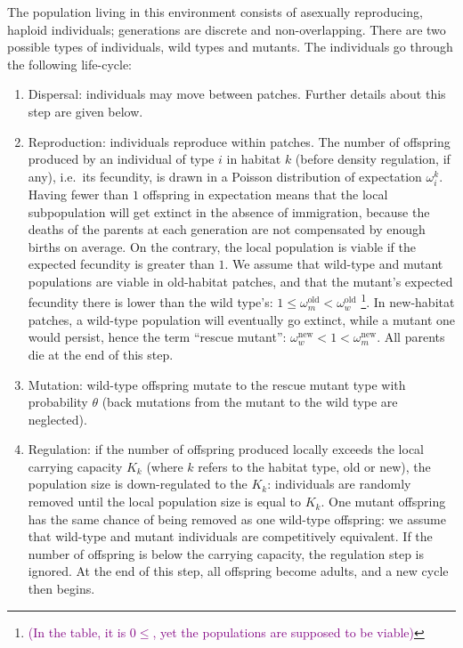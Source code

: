 \documentclass[a4paper,11pt]{article}
\newcommand{\florence}[1]{\textcolor{purple}{(#1)}} %
\begin{document}
The population living in this environment consists of asexually reproducing, haploid individuals; generations are discrete and non-overlapping. There are two possible types of individuals, wild types and mutants. The individuals go through the following life-cycle: \begin{enumerate}[label = (\roman*)]
	\item Dispersal: individuals may move between patches. Further details about this step are given below.
	\item Reproduction: individuals reproduce within patches. The number of offspring produced by an individual of type $i$ in habitat $k$ (before density regulation, if any), i.e.\ its fecundity, is drawn in a Poisson distribution of expectation $\omega_i^k$. Having fewer than $1$ offspring in expectation means that the local subpopulation will get extinct in the absence of immigration, because the deaths of the parents at each generation are not compensated by enough births on average. On the contrary, the local population is viable if the expected fecundity is greater than $1$. We assume that wild-type and mutant populations are viable in old-habitat patches, and that the mutant's expected fecundity there is lower than the wild type's: $1 \leq \omega^{\text{old}}_m < \omega^{\text{old}}_w$ \footnote{\florence{In the table, it is $0 \leq $, yet the populations are supposed to be viable}}. In new-habitat patches, a wild-type population will eventually go extinct, while a mutant one would persist, hence the term ``rescue mutant'': $\omega^{\text{new}}_w < 1 < \omega^{\text{new}}_m$. 
	All parents die at the end of this step.
	\item {} Mutation: wild-type offspring mutate to the rescue mutant type with probability $\theta$ (back mutations from the mutant to the wild type are neglected).
	\item {}Regulation: if the number of offspring produced locally exceeds the local carrying capacity $K_k$ (where $k$ refers to the habitat type, old or new), the population size is down-regulated to the $K_k$: individuals are randomly removed until the local population size is equal to $K_k$. One mutant offspring has the same chance of being removed as one wild-type offspring:  we assume that wild-type and mutant individuals are competitively equivalent. If the number of offspring is below the carrying capacity, the regulation step is ignored. 
	At the end of this step, all offspring become adults, and a new cycle then begins.
\end{enumerate}
\end{document}
